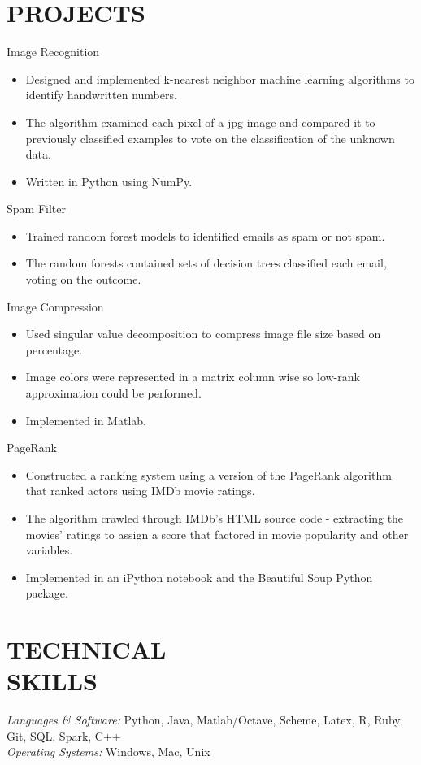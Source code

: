 \documentclass[resmargin, 6pt]{res} %
\begin{document}
\begin{resume}

\section{PROJECTS}Image Recognition
		\begin{itemize} \itemsep -2pt
		\item Designed and implemented k-nearest neighbor machine learning algorithms to identify handwritten numbers.
		\item The algorithm examined each pixel of a jpg image and compared it to previously classified examples to vote on the classification of the unknown data.
		\item Written in Python using NumPy.
		\end{itemize}
		Spam Filter
		\begin{itemize} \itemsep -2pt
		\item Trained random forest models to identified emails as spam or not spam.
		\item The random forests contained sets of decision trees classified each email, voting on the outcome.
		\end{itemize}
		Image Compression
		\begin{itemize} \itemsep -2pt
		\item Used singular value decomposition to compress image file size based on percentage.
		\item Image colors were represented in a matrix column wise so low-rank approximation could be performed.
		\item Implemented in Matlab.
		\end{itemize}
		PageRank
		\begin{itemize} \itemsep -2pt
		\item Constructed a ranking system using a version of the PageRank algorithm that ranked actors using IMDb movie ratings.  
		\item The algorithm crawled through IMDb’s HTML source code - extracting the movies’ ratings to assign a score that factored in movie popularity and other variables.
		\item Implemented in an iPython notebook and the Beautiful Soup Python package.
		\end{itemize}

\section{TECHNICAL \\ SKILLS} {\sl Languages \& Software:} Python, Java, Matlab/Octave, 
         Scheme, Latex, R, Ruby, Git, SQL, Spark, C++\\
                {\sl Operating Systems:} Windows, Mac, Unix\\
								

\end{resume}
\end{document}
